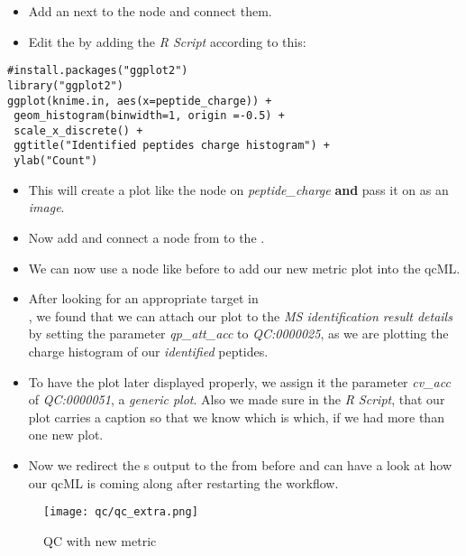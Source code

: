 \begin{itemize}
\item Add an  next to the  node and connect them.
\item Edit the  by adding the \textit{R Script} according to this:
\end{itemize}
\begin{listing}
\begin{verbatim}
#install.packages("ggplot2")
library("ggplot2")
ggplot(knime.in, aes(x=peptide_charge)) + 
 geom_histogram(binwidth=1, origin =-0.5) + 
 scale_x_discrete() + 
 ggtitle("Identified peptides charge histogram") + 
 ylab("Count")
\end{verbatim}
\end{listing}
\begin{itemize}
\item This will create a plot like the  node on \textit{peptide\_charge} \textbf{and} pass it on as an \textit{image}. 
\item Now add and connect a  node from  to the .
\item We can now use a  node like before to add our new metric plot into the qcML.
\item After looking for an appropriate target in \\ , we found that we can attach our plot to the \textit{MS identification result details} by setting the parameter \textit{qp\_att\_acc} to \textit{QC:0000025}, as we are plotting the charge histogram of our \textit{identified} peptides.
\item To have the plot later displayed properly, we assign it the parameter \textit{cv\_acc} of \textit{QC:0000051}, a \textit{generic plot}. Also we made sure in the \textit{R Script}, that our plot carries a caption so that we know which is which, if we had more than one new plot.
\item Now we redirect the s output to the  from before and can have a look at how our qcML is coming along after restarting the workflow.
\end{itemize}

\begin{figure}[htbp]
  \centering
  \texttt{[image: qc/qc\_extra.png]}
  \caption{QC with new metric}
  \label{fig:qc_extra}
\end{figure}

